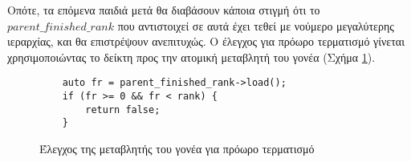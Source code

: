 Οπότε, τα επόμενα παιδιά μετά θα διαβάσουν κάποια στιγμή ότι το $parent\_finished\_rank$ που αντιστοιχεί σε αυτά έχει τεθεί με νούμερο μεγαλύτερης ιεραρχίας, και θα επιστρέψουν ανεπιτυχώς.
Ο έλεγχος για πρόωρο τερματισμό γίνεται χρησιμοποιώντας το δείκτη προς την ατομική μεταβλητή του γονέα (Σχήμα \ref{fig:rec_top_down_stop}).

\begin{figure}[h]
\setlength\partopsep{-\topsep}%
\begin{verbatim}
    auto fr = parent_finished_rank->load();
    if (fr >= 0 && fr < rank) { 
        return false;
    }
\end{verbatim}
\caption{Έλεγχος της μεταβλητής του γονέα για πρόωρο τερματισμό}
  \label{fig:rec_top_down_stop}
\end{figure}
